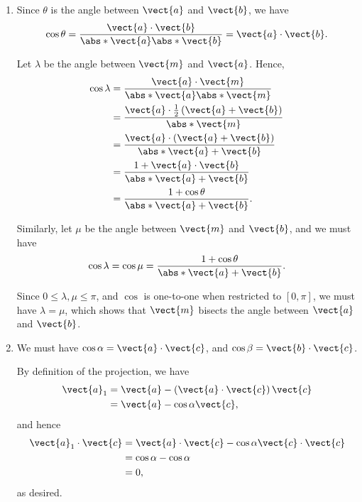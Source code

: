 \Question{\currfilebase}

\begin{enumerate}
    \item Since \(\theta\) is the angle between \(\vect{a}\) and \(\vect{b}\), we have
          \[
              \cos \theta = \frac{\vect{a} \cdot \vect{b}}{\abs*{\vect{a}} \abs*{\vect{b}}} = \vect{a} \cdot \vect{b}.
          \]

          Let \(\lambda\) be the angle between \(\vect{m}\) and \(\vect{a}\). Hence,
          \begin{align*}
              \cos \lambda & = \frac{\vect{a} \cdot \vect{m}}{\abs*{\vect{a}} \abs*{\vect{m}}}                     \\
                           & = \frac{\vect{a} \cdot \frac{1}{2} \left(\vect{a} + \vect{b}\right)}{\abs*{\vect{m}}} \\
                           & = \frac{\vect{a} \cdot \left(\vect{a} + \vect{b}\right)}{\abs*{\vect{a} + \vect{b}}}  \\
                           & = \frac{1 + \vect{a} \cdot \vect{b}}{\abs*{\vect{a} + \vect{b}}}                      \\
                           & = \frac{1 + \cos \theta}{\abs*{\vect{a} + \vect{b}}}.
          \end{align*}

          Similarly, let \(\mu\) be the angle between \(\vect{m}\) and \(\vect{b}\), and we must have
          \[
              \cos \lambda = \cos \mu = \frac{1 + \cos \theta}{\abs*{\vect{a} + \vect{b}}}.
          \]

          Since \(0 \leq \lambda, \mu \leq \pi\), and \(\cos\) is one-to-one when restricted to \([0, \pi]\), we must have \(\lambda = \mu\), which shows that \(\vect{m}\) bisects the angle between \(\vect{a}\) and \(\vect{b}\).

    \item We must have \(\cos \alpha = \vect{a} \cdot \vect{c}\), and \(\cos \beta = \vect{b} \cdot \vect{c}\).

          By definition of the projection, we have
          \begin{align*}
              \vect{a}_1 & = \vect{a} - \left(\vect{a} \cdot \vect{c}\right) \vect{c} \\
                         & = \vect{a} - \cos \alpha \vect{c},
          \end{align*}
          and hence
          \begin{align*}
              \vect{a}_1 \cdot \vect{c} & = \vect{a} \cdot \vect{c} - \cos \alpha \vect{c} \cdot \vect{c} \\
                                        & = \cos \alpha - \cos \alpha                                     \\
                                        & = 0,
          \end{align*}
          as desired.


\end{enumerate}
